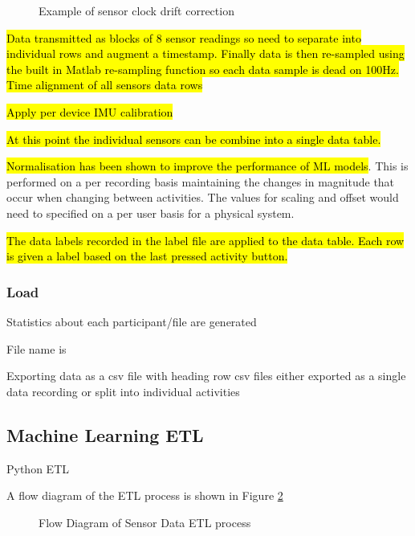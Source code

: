 \begin{figure}[!hbt]
    \centering
    \caption{Example of sensor clock drift correction}
    \label{fig:methods-clock-drift-correction}
\end{figure}

\hl{Data transmitted as blocks of 8 sensor readings so need to separate into individual rows and augment a timestamp. Finally data is then re-sampled using the built in Matlab re-sampling function so each data sample is dead on 100Hz. Time alignment of all sensors data rows}

\hl{Apply per device IMU calibration}

\hl{At this point the individual sensors can be combine into a single data table.}

\hl{Normalisation has been shown to improve the performance of ML models}. \cite{} %
This is performed on a per recording basis maintaining the changes in magnitude that occur when changing between activities. The values for scaling and offset would need to specified on a per user basis for a physical system.

\hl{The data labels recorded in the label file are applied to the data table. Each row is given a label based on the last pressed activity button.}

\subsubsection{Load}
Statistics about each participant/file are generated

File name is

Exporting data as a csv file with heading row
csv files either exported as a single data recording or split into individual activities

\subsection{Machine Learning ETL}
\label{subsec:ML-ETL}
Python ETL

A flow diagram of the ETL process is shown in Figure \ref{fig:methods_ml_ETL}

\begin{figure}[!hbt]
    \centering
    \caption{Flow Diagram of Sensor Data ETL process}
    \label{fig:methods_ml_ETL}
\end{figure}

